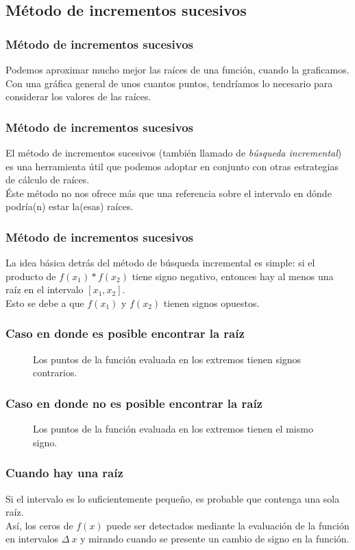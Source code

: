 \subsection{Método de incrementos sucesivos}
\begin{frame}
\frametitle{Método de incrementos sucesivos}
Podemos aproximar mucho mejor las raíces de una función, cuando la graficamos.
\\
\bigskip
Con una gráfica general de unos cuantos puntos, tendríamos lo necesario para considerar los valores de las raíces.
\end{frame}
\begin{frame}
\frametitle{Método de incrementos sucesivos}
El método de incrementos sucesivos (también llamado de \emph{búsqueda incremental}) es una herramienta útil que podemos adoptar en conjunto con otras estrategias de cálculo de raíces.
\\
\bigskip
Éste método no nos ofrece más que una referencia sobre el intervalo en dónde podría(n) estar la(esas) raíces.
\end{frame}
\begin{frame}
\frametitle{Método de incrementos sucesivos}
La idea básica detrás del método de búsqueda incremental es simple: si el producto de $f(x_{1}) * f(x_{2})$ tiene signo negativo, entonces hay al menos una raíz en el intervalo $[x_{1}, x_{2}]$.
\\
\bigskip
Esto se debe a que $f(x_{1})$ y $f(x_{2})$ tienen signos opuestos.
\end{frame}
\begin{frame}[fragile]
\frametitle{Caso en donde es posible encontrar la raíz}
\begin{figure}
	\centering
	
	\caption{Los puntos de la función evaluada en los extremos tienen signos contrarios.}
\end{figure}
\end{frame}
\begin{frame}[fragile]
\frametitle{Caso en donde no es posible encontrar la raíz}
\begin{figure}
	\centering
	
	\caption{Los puntos de la función evaluada en los extremos tienen el mismo signo.}
\end{figure}
\end{frame}
\begin{frame}
\frametitle{Cuando hay una raíz}
Si el intervalo es lo suficientemente pequeño, es probable que contenga una sola raíz.
\\
\bigskip
Así, los ceros de $f(x)$ puede ser detectados mediante la evaluación de la función en  intervalos $\Delta \: x$ y mirando cuando se presente un cambio de signo en la función.
\end{frame}
